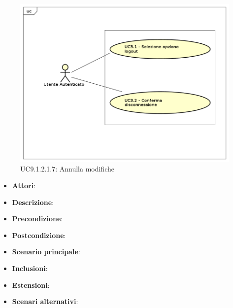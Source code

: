 					\label{UC9.1.2.1.7}
					\begin{figure}[h]
						\centering
					\includegraphics[scale=0.7,keepaspectratio]{UML/UC9.png}
						\caption{UC9.1.2.1.7: Annulla modifiche}
					\end{figure}
					\FloatBarrier
					\begin{itemize}
						\item \textbf{Attori}: 
						\item \textbf{Descrizione}: 
						\item \textbf{Precondizione}: 
						\item \textbf{Postcondizione}: 
						\item \textbf{Scenario principale}:
						\item \textbf{Inclusioni}:
						\item \textbf{Estensioni}:
						\item \textbf{Scenari alternativi}:
					\end{itemize}
					
